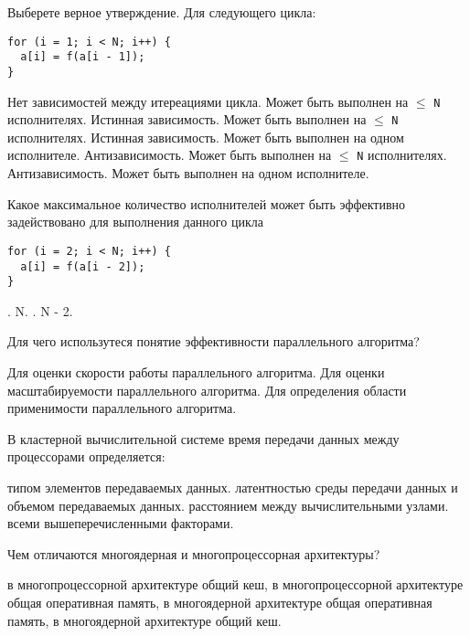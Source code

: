 \documentclass[a4paper, 12pt, addpoints]{exam}
\begin{document}
\begin{questions}
\question[1]
Выберете верное утверждение. Для следующего цикла:
\begin{lstlisting}
for (i = 1; i < N; i++) {
  a[i] = f(a[i - 1]);
}
\end{lstlisting}
\begin{choices}
    \choice Нет зависимостей между итереациями цикла. Может быть выполнен на $\leq$ \texttt{N} исполнителях.
    \choice Истинная зависимость. Может быть выполнен на $\leq$ \texttt{N} исполнителях.
    \correctchoice Истинная зависимость. Может быть выполнен на одном исполнителе.
    \choice Антизависимость. Может быть выполнен на $\leq$ \texttt{N} исполнителях.
    \choice Антизависимость. Может быть выполнен на одном исполнителе.
\end{choices}

\question[1] Какое максимальное количество исполнителей может быть эффективно задействовано для выполнения данного цикла
\begin{lstlisting}
for (i = 2; i < N; i++) {
  a[i] = f(a[i - 2]);
}
\end{lstlisting}
\begin{choices}
    .
    \choice N.
    .
    \choice N - 2.
\end{choices}

\question[1] Для чего использутеся понятие эффективности параллельного алгоритма?
\begin{choices}
    \choice Для оценки скорости работы параллельного алгоритма.
    \correctchoice Для оценки масштабируемости параллельного алгоритма.
    \choice Для определения области применимости параллельного алгоритма.
\end{choices}

\question[1] В кластерной вычислительной системе время передачи данных между процессорами определяется:
\begin{choices}
    \choice типом элементов передаваемых данных.
    \correctchoice латентностью среды передачи данных и объемом передаваемых данных.
    \choice расстоянием между вычислительными узлами.
    \choice всеми вышеперечисленными факторами.
\end{choices}

\question[1] Чем отличаются многоядерная и многопроцессорная архитектуры?
\begin{choices}
    \choice в многопроцессорной архитектуре общий кеш,
    \choice в многопроцессорной архитектуре общая оперативная память,
    \choice в многоядерной архитектуре общая оперативная память,
    \correctchoice в многоядерной архитектуре общий кеш.
\end{choices}


\end{questions}
\end{document}
